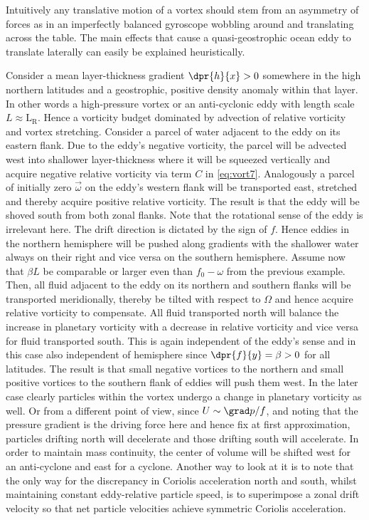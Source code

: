 
Intuitively any translative motion of a vortex should stem from an asymmetry of forces as in an imperfectly balanced gyroscope wobbling around and translating across the table. The main effects that cause a quasi-geostrophic ocean eddy to translate laterally can easily be explained heuristically.
\begin{description}
Consider a mean layer-thickness gradient $\dpr{h}{x}>0$ somewhere in the high northern latitudes and a geostrophic, positive density anomaly within that layer.
In other words a high-pressure vortex or an anti-cyclonic eddy with length scale $L\approx \mathrm{L_{R}}$. Hence a vorticity budget dominated by advection of
relative vorticity and vortex stretching. Consider a parcel of water adjacent to the eddy on its eastern flank. Due to the eddy's negative vorticity, the parcel
will be advected west into shallower layer-thickness where it will be squeezed vertically and acquire negative relative vorticity via term $C$ in \eqref{eq:vort7}.
Analogously a parcel of initially zero $\vec{\omega}$ on the eddy's western flank will be transported east, stretched and thereby acquire positive relative
vorticity. The result is that the eddy will be shoved south from both zonal flanks. Note that the rotational sense of the eddy is irrelevant here. The drift
direction is dictated by the sign of $f$. Hence eddies in the
northern hemisphere will be pushed along gradients with the shallower water always on their right and vice versa on the southern hemisphere.
Assume now that $\beta L$ be comparable or larger even than $f_{0}-\omega$ from the previous example. Then, all fluid adjacent to the eddy on its northern and southern flanks will be transported meridionally, thereby be tilted with respect to $\Omega$ and hence acquire relative vorticity to compensate. All fluid transported north will balance the increase in planetary vorticity with a decrease in relative vorticity and vice versa for fluid transported south. This is again independent of the eddy's sense and in this case also independent of hemisphere since $\dpr{f}{y}=\beta>0$ for all latitudes. The result is that small negative vortices to the northern and small positive vortices to the southern flank of eddies will push them west.
In the later case clearly particles within the vortex undergo a change in planetary vorticity as well. Or from a different point of view, since $U \sim \grad p/f  $, and noting that the pressure gradient is the driving force here and hence fix at first approximation, particles drifting north will decelerate and those drifting south will accelerate. In order to maintain mass continuity, the center of volume will be shifted west for an anti-cyclone and east for a cyclone. Another way to look at it is to note that the only way for the discrepancy in Coriolis acceleration north and south, whilst maintaining constant eddy-relative particle speed, is to superimpose a zonal drift velocity so that net particle velocities achieve symmetric Coriolis acceleration.
\end{description}

\newpage

